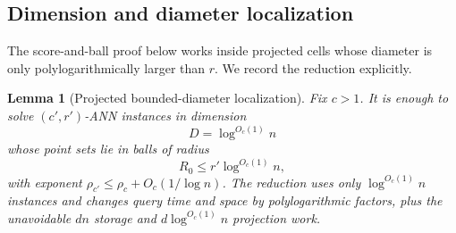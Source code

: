 \documentclass[10pt]{article}
\newtheorem{lemma}[theorem]{Lemma}
\theoremstyle{definition}
\begin{document}
\subsection{Dimension and diameter localization}

The score-and-ball proof below works inside projected cells whose diameter is only polylogarithmically larger than $r$. We record the reduction explicitly.

\begin{lemma}[Projected bounded-diameter localization]\label{lem:localization}
   Fix $c>1$. It is enough to solve $(c',r')$-ANN instances in dimension
   \[
      D=\log^{O_c(1)}n
   \]
   whose point sets lie in balls of radius
   \[
      R_0\le r'\log^{O_c(1)}n,
   \]
   with exponent $\rho_{c'}\le\rho_c+O_c(1/\log n)$. The reduction uses only $\log^{O_c(1)}n$ instances and changes query time and space by polylogarithmic factors, plus the unavoidable $dn$ storage and $d\log^{O_c(1)}n$ projection work.
\end{lemma}
\end{document}
